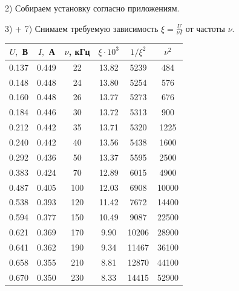 \documentclass[a4paper,12pt]{extarticle}
\begin{document}
2) Собираем установку согласно приложениям.

3) + 7) Снимаем требуемую зависимость $\xi = \frac{U}{\nu I}$ от частоты $\nu$. \\ 
\begin{tabular}{|c|c|c|c|c|c|}
\hline
$U,$ В     & $I,$ А    & $\nu$, кГц   & $\xi \cdot 10^3$ & $1/\xi^2$ & $\nu^2$ \\ \hline
0.137 & 0.449 & 22  & 13.82                                         & 5239                    & 484                   \\ \hline
0.148 & 0.448 & 24  & 13.80                                         & 5254                    & 576                   \\ \hline
0.160 & 0.448 & 26  & 13.77                                         & 5273                    & 676                   \\ \hline
0.184 & 0.446 & 30  & 13.72                                         & 5313                    & 900                   \\ \hline
0.212 & 0.442 & 35  & 13.71                                         & 5320                    & 1225                  \\ \hline
0.240 & 0.442 & 40  & 13.56                                         & 5438                    & 1600                  \\ \hline
0.292 & 0.436 & 50  & 13.37                                         & 5595                    & 2500                  \\ \hline
0.383 & 0.424 & 70  & 12.89                                         & 6015                    & 4900                  \\ \hline
0.487 & 0.405 & 100 & 12.03                                         & 6908                    & 10000                 \\ \hline
0.538 & 0.393 & 120 & 11.42                                         & 7672                    & 14400                 \\ \hline
0.594 & 0.377 & 150 & 10.49                                         & 9087                    & 22500                 \\ \hline
0.621 & 0.369 & 170 & 9.90                                          & 10206                   & 28900                 \\ \hline
0.641 & 0.362 & 190 & 9.34                                          & 11467                   & 36100                 \\ \hline
0.658 & 0.355 & 210 & 8.81                                          & 12870                   & 44100                 \\ \hline
0.670 & 0.350 & 230 & 8.33                                          & 14415                   & 52900                 \\ \hline
\end{tabular}
\end{document}
